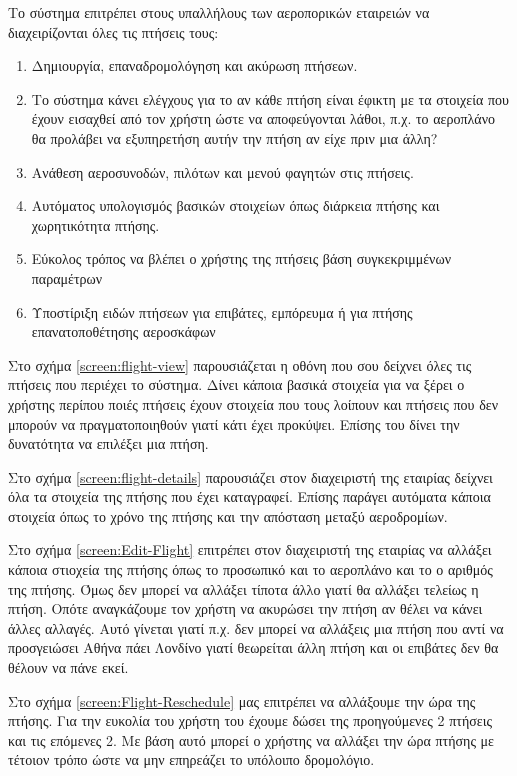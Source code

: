 \documentclass{article}
\begin{document}
	Το σύστημα επιτρέπει στους υπαλλήλους των αεροπορικών εταιρειών να διαχειρίζονται όλες τις πτήσεις τους:
	\begin{enumerate}
		\item Δημιουργία, επαναδρομολόγηση και ακύρωση πτήσεων. 
		\item Το σύστημα κάνει ελέγχους για το αν κάθε πτήση είναι έφικτη με τα στοιχεία που έχουν εισαχθεί από τον χρήστη ώστε να αποφεύγονται λάθοι, π.χ. το αεροπλάνο θα προλάβει να εξυπηρετήση αυτήν την πτήση αν είχε πριν μια άλλη?
		\item Ανάθεση αεροσυνοδών, πιλότων και μενού φαγητών στις πτήσεις.
		\item Αυτόματος υπολογισμός βασικών στοιχείων όπως διάρκεια πτήσης και χωρητικότητα πτήσης.
		\item Εύκολος τρόπος να βλέπει ο χρήστης της πτήσεις βάση συγκεκριμμένων παραμέτρων
		\item Υποστίριξη ειδών πτήσεων για επιβάτες, εμπόρευμα ή για πτήσης επανατοποθέτησης αεροσκάφων
	\end{enumerate}

	Στο σχήμα \ref{screen:flight-view} παρουσιάζεται η οθόνη που σου δείχνει όλες τις πτήσεις που περιέχει το σύστημα.
	Δίνει κάποια βασικά στοιχεία για να ξέρει ο χρήστης περίπου ποιές πτήσεις έχουν στοιχεία που τους λοίπουν και
	πτήσεις που δεν μπορούν να πραγματοποιηθούν γιατί κάτι έχει προκύψει. Επίσης του δίνει την δυνατότητα να επιλέξει
	μια πτήση. 
	
	Στο σχήμα \ref{screen:flight-details} παρουσιάζει στον διαχειριστή της εταιρίας δείχνει όλα τα στοιχεία της πτήσης
	που έχει καταγραφεί. Επίσης παράγει αυτόματα κάποια στοιχεία όπως το χρόνο της πτήσης και την απόσταση μεταξύ 
	αεροδρομίων.

	Στο σχήμα \ref{screen:Edit-Flight} επιτρέπει στον διαχειριστή της εταιρίας να αλλάξει κάποια στιοχεία της πτήσης
	όπως το προσωπικό και το αεροπλάνο και το ο αριθμός της πτήσης. Όμως δεν μπορεί να αλλάξει τίποτα άλλο γιατί
	θα αλλάξει τελείως η πτήση. Οπότε αναγκάζουμε τον χρήστη να ακυρώσει την πτήση αν θέλει να κάνει άλλες αλλαγές.
	Αυτό γίνεται γιατί π.χ. δεν μπορεί να αλλάξεις μια πτήση που αντί να προσγειώσει Αθήνα πάει Λονδίνο γιατί θεωρείται
	άλλη πτήση και οι επιβάτες δεν θα θέλουν να πάνε εκεί.

	Στο σχήμα \ref{screen:Flight-Reschedule} μας επιτρέπει να αλλάξουμε την ώρα της πτήσης. Για την ευκολία του χρήστη
	του έχουμε δώσει της προηγούμενες 2 πτήσεις και τις επόμενες 2. Με βάση αυτό μπορεί ο χρήστης να αλλάξει την ώρα
	πτήσης με τέτοιον τρόπο ώστε να μην επηρεάζει το υπόλοιπο δρομολόγιο. 
\end{document}
